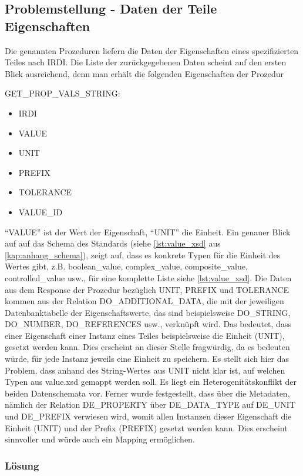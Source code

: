 \subsection{Problemstellung - Daten der Teile Eigenschaften}\label{sec:problemdateneigenschaften}

Die genannten Prozeduren liefern die Daten der Eigenschaften eines spezifizierten Teiles nach IRDI. Die Liste der zurückgegebenen Daten scheint auf den ersten Blick ausreichend, denn man erhält die folgenden Eigenschaften der Prozedur

GET\_PROP\_VALS\_STRING:

\begin{itemize}
  \item IRDI
  \item VALUE
  \item UNIT
  \item PREFIX
  \item TOLERANCE
  \item VALUE\_ID
\end{itemize}

\enquote{VALUE} ist der Wert der Eigenschaft, \enquote{UNIT} die Einheit. Ein genauer Blick auf auf das Schema des Standards (siehe \autoref{lst:value_xsd} aus \autoref{kap:anhang_schema}), zeigt auf, dass es konkrete Typen für die Einheit des Wertes gibt, z.B. boolean\_value, complex\_value, composite\_value, controlled\_value usw., für eine komplette Liste siehe \autoref{lst:value_xsd}. 
Die Daten aus dem Response der Prozedur bezüglich UNIT, PREFIX und TOLERANCE kommen aus der Relation DO\_ADDITIONAL\_DATA, die mit der jeweiligen Datenbanktabelle der Eigenschaftswerte, das sind beispielsweise DO\_STRING, DO\_NUMBER, DO\_REFERENCES usw., verknüpft wird. Das bedeutet, dass einer Eigenschaft einer Instanz eines Teiles beispielsweise die Einheit (UNIT), gesetzt werden kann. Dies erscheint an dieser Stelle fragwürdig, da es bedeuten würde, für jede Instanz jeweils eine Einheit zu speichern. 
Es stellt sich hier das Problem, dass anhand des String-Wertes aus UNIT nicht klar ist, auf welchen Typen aus value.xsd gemappt werden soll. Es liegt ein Heterogenitätskonflikt der beiden Datenschemata vor.  
Ferner wurde festgestellt, dass über die Metadaten, nämlich der Relation DE\_PROPERTY über DE\_DATA\_TYPE auf DE\_UNIT und DE\_PREFIX verwiesen wird, womit allen Instanzen dieser Eigenschaft die Einheit (UNIT) und der Prefix (PREFIX) gesetzt werden kann. Dies erscheint sinnvoller und würde auch ein Mapping ermöglichen. 

\subsubsection{Lösung}

